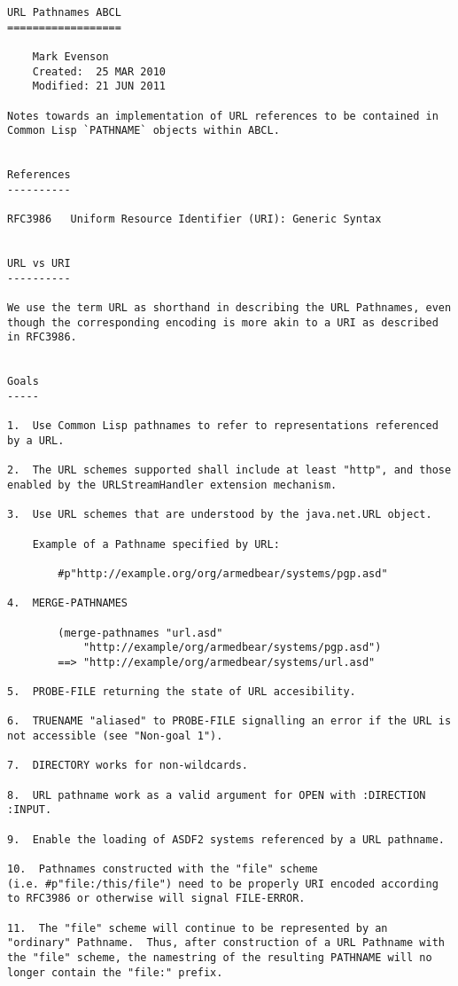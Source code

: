 \begin{verbatim}



URL Pathnames ABCL
==================

    Mark Evenson
    Created:  25 MAR 2010
    Modified: 21 JUN 2011

Notes towards an implementation of URL references to be contained in
Common Lisp `PATHNAME` objects within ABCL.


References
----------

RFC3986   Uniform Resource Identifier (URI): Generic Syntax


URL vs URI
----------

We use the term URL as shorthand in describing the URL Pathnames, even
though the corresponding encoding is more akin to a URI as described
in RFC3986.  


Goals
-----

1.  Use Common Lisp pathnames to refer to representations referenced
by a URL.

2.  The URL schemes supported shall include at least "http", and those
enabled by the URLStreamHandler extension mechanism.

3.  Use URL schemes that are understood by the java.net.URL object.

    Example of a Pathname specified by URL:
    
        #p"http://example.org/org/armedbear/systems/pgp.asd"
    
4.  MERGE-PATHNAMES 

        (merge-pathnames "url.asd"
            "http://example/org/armedbear/systems/pgp.asd")
        ==> "http://example/org/armedbear/systems/url.asd"

5.  PROBE-FILE returning the state of URL accesibility.

6.  TRUENAME "aliased" to PROBE-FILE signalling an error if the URL is
not accessible (see "Non-goal 1").

7.  DIRECTORY works for non-wildcards.

8.  URL pathname work as a valid argument for OPEN with :DIRECTION :INPUT.

9.  Enable the loading of ASDF2 systems referenced by a URL pathname.

10.  Pathnames constructed with the "file" scheme
(i.e. #p"file:/this/file") need to be properly URI encoded according
to RFC3986 or otherwise will signal FILE-ERROR.  

11.  The "file" scheme will continue to be represented by an
"ordinary" Pathname.  Thus, after construction of a URL Pathname with
the "file" scheme, the namestring of the resulting PATHNAME will no
longer contain the "file:" prefix.


\end{verbatim}
